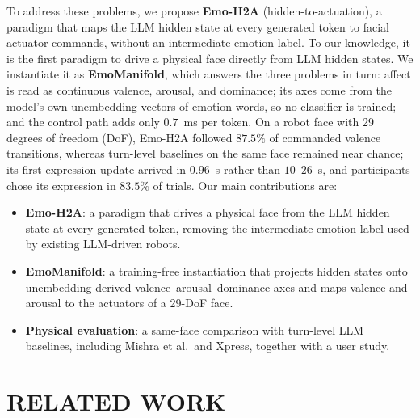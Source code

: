 \documentclass[letterpaper, 10 pt, conference]{ieeeconf/ieeeconf}
\begin{document}
To address these problems, we propose \textbf{Emo-H2A} (hidden-to-actuation), a paradigm that maps the LLM hidden state at every generated token to facial actuator commands, without an intermediate emotion label. To our knowledge, it is the first paradigm to drive a physical face directly from LLM hidden states. We instantiate it as \textbf{EmoManifold}, which answers the three problems in turn: affect is read as continuous valence, arousal, and dominance; its axes come from the model's own unembedding vectors of emotion words, so no classifier is trained; and the control path adds only $0.7$~ms per token. On a robot face with 29 degrees of freedom (DoF), Emo-H2A followed $87.5\%$ of commanded valence transitions, whereas turn-level baselines on the same face remained near chance; its first expression update arrived in $0.96$~s rather than $10$--$26$~s, and participants chose its expression in $83.5\%$ of trials. Our main contributions are:
\begin{itemize}
\item \textbf{Emo-H2A}: a paradigm that drives a physical face from the LLM hidden state at every generated token, removing the intermediate emotion label used by existing LLM-driven robots.
\item \textbf{EmoManifold}: a training-free instantiation that projects hidden states onto unembedding-derived valence--arousal--dominance axes and maps valence and arousal to the actuators of a 29-DoF face.
\item \textbf{Physical evaluation}: a same-face comparison with turn-level LLM baselines, including Mishra et al.\ and Xpress, together with a user study.
\end{itemize}

\section{RELATED WORK}
\label{sec:related}
\end{document}
